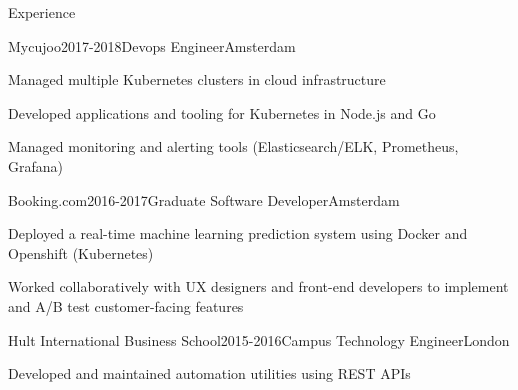 \documentclass{resume} %
\begin{document}
\begin{rSection}{Experience}
\begin{rSubsection}{{Mycujoo}}{2017-2018}{Devops Engineer}{Amsterdam}
    \item Managed multiple Kubernetes clusters in cloud infrastructure
    \item Developed applications and tooling for Kubernetes in Node.js and Go
    \item Managed monitoring and alerting tools (Elasticsearch/ELK, Prometheus, Grafana)
\end{rSubsection}

\begin{rSubsection}{{Booking.com}}{2016-2017}{Graduate Software Developer}{Amsterdam}
    \item Deployed a real-time machine learning prediction system using Docker and Openshift (Kubernetes)
    \item Worked collaboratively with UX designers and front-end developers to implement and A/B test customer-facing features
\end{rSubsection}

\begin{rSubsection}{{Hult International Business School}}{2015-2016}{Campus Technology Engineer}{London}
    \item Developed and maintained automation utilities using REST APIs
\end{rSubsection}

\end{rSection}

\newpage

\end{document}
